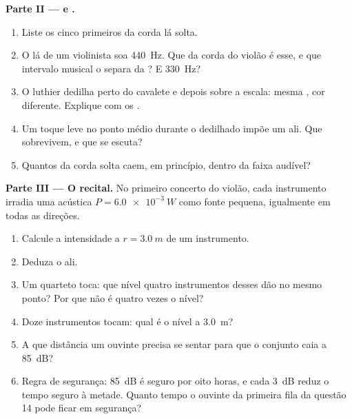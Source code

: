 \begin{problem}
\medskip
\noindent\textbf{Parte II ---  e .}
\begin{enumerate}[resume]
  \item Liste os cinco primeiros  da corda lá solta.
  \item O lá de um violinista soa \qty{440}{Hz}. Que  da corda
        do violão é esse, e que intervalo musical o separa da
        ? E \qty{330}{Hz}?
  \item O luthier dedilha perto do cavalete e depois sobre a escala:
        mesma , cor diferente. Explique com os .
  \item Um toque leve no ponto médio durante o dedilhado impõe um 
        ali. Que  sobrevivem, e que  se escuta?
  \item Quantos  da corda solta caem, em princípio, dentro da
        faixa audível?
\end{enumerate}

\medskip
\noindent\textbf{Parte III --- O recital.}
No primeiro concerto do violão, cada instrumento irradia uma 
acústica $P = \qty{6.0e-3}{W}$ como fonte pequena, igualmente em todas as
direções.
\begin{enumerate}[resume]
  \item Calcule a intensidade a $r = \qty{3.0}{m}$ de um instrumento.
  \item Deduza o  ali.
  \item Um quarteto toca: que nível quatro instrumentos desses dão no
        mesmo ponto? Por que não é quatro vezes o nível?
  \item Doze instrumentos tocam: qual é o nível a \qty{3.0}{m}?
  \item A que distância um ouvinte precisa se sentar para que o conjunto
        caia a \qty{85}{dB}?
  \item Regra de segurança: \qty{85}{dB} é seguro por oito horas, e cada
        \qty{+3}{dB} reduz o tempo seguro à metade. Quanto tempo o
        ouvinte da primeira fila da questão 14 pode ficar em segurança?
\end{enumerate}


\end{problem}
